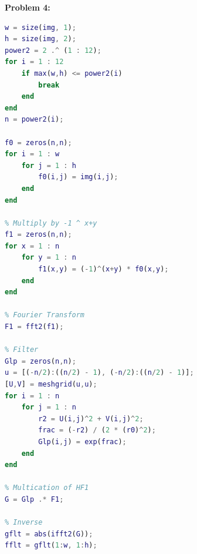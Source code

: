 \documentclass[11pt]{article}
\newenvironment{problem}[1]{\textbf{Problem #1: }}{\newpage}
\begin{document}
\begin{problem}{4}
\begin{enumerate}[label = (\alph*)]
\begin{lstlisting}[language=Matlab]
% Padding for Size
w = size(img, 1);
h = size(img, 2);
power2 = 2 .^ (1 : 12);
for i = 1 : 12
	if max(w,h) <= power2(i)
		break
	end
end
n = power2(i);

f0 = zeros(n,n);
for i = 1 : w
	for j = 1 : h
		f0(i,j) = img(i,j);
	end
end

% Multiply by -1 ^ x+y
f1 = zeros(n,n);
for x = 1 : n
	for y = 1 : n
		f1(x,y) = (-1)^(x+y) * f0(x,y);
	end
end

% Fourier Transform
F1 = fft2(f1);

% Filter 
Glp = zeros(n,n);
u = [(-n/2):((n/2) - 1), (-n/2):((n/2) - 1)];
[U,V] = meshgrid(u,u);
for i = 1 : n
	for j = 1 : n
		r2 = U(i,j)^2 + V(i,j)^2;
		frac = (-r2) / (2 * (r0)^2);
		Glp(i,j) = exp(frac);
	end
end

% Multication of HF1
G = Glp .* F1;

% Inverse
gflt = abs(ifft2(G));
fflt = gflt(1:w, 1:h);


\end{lstlisting}
\end{enumerate}
\end{problem}
\end{document}
